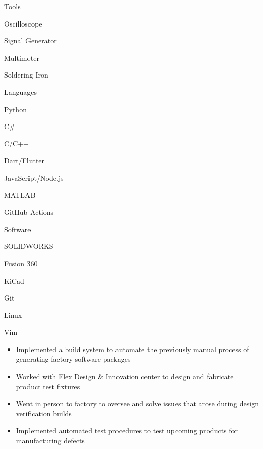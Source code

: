 \documentclass{resume}
\author{Jasper Chan}
\begin{document}
\maketitle

\vspace{-1em} %
\TechnicalSkills

\begin{TechSkills}{Tools}
    \item Oscilloscope
    \item Signal Generator
    \item Multimeter
    \item Soldering Iron
\end{TechSkills}
\begin{TechSkills}{Languages}
    \item Python
    \item C\#
    \item C/C++
    \item Dart/Flutter
    \item JavaScript/Node.js
    \item MATLAB
    \item GitHub Actions
\end{TechSkills}
\begin{TechSkills}{Software}
    \item SOLIDWORKS
    \item Fusion 360
    \item KiCad
    \item Git
    \item Linux
    \item Vim
\end{TechSkills}

\WorkExperience

\begin{itemize}
    \item Implemented a build system to automate the previously manual process of generating factory software packages
    \item Worked with Flex Design \& Innovation center to design and fabricate product test fixtures
    \item Went in person to factory to oversee and solve issues that arose during design verification builds
    \item Implemented automated test procedures to test upcoming products for manufacturing defects
\end{itemize}
\end{document}
